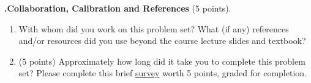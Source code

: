 \documentclass[12pt]{amsart}
\newenvironment{statement}[1]{\smallskip\noindent\color[rgb]{0.0,0.0,0.0} {\bf #1.}}{}
\theoremstyle{definition}
\theoremstyle{remark}
\newcommand{\1}{\mathds{1}}
\begin{document}
\newpage
\begin{statement}{6}
\noindent \textbf{Collaboration, Calibration and References} (5 points).
\begin{enumerate}
    \item With whom did you work on this problem set? What (if any) references and/or resources did you use beyond the course lecture slides and textbook? 
    \item (5 points) Approximately how long did it take you to complete this problem set? Please complete this brief \href{https://forms.gle/7yDD1QoEfwCfBf7u9}{survey} worth 5 points, graded for completion.
\end{enumerate}
\end{statement}
\end{document}

